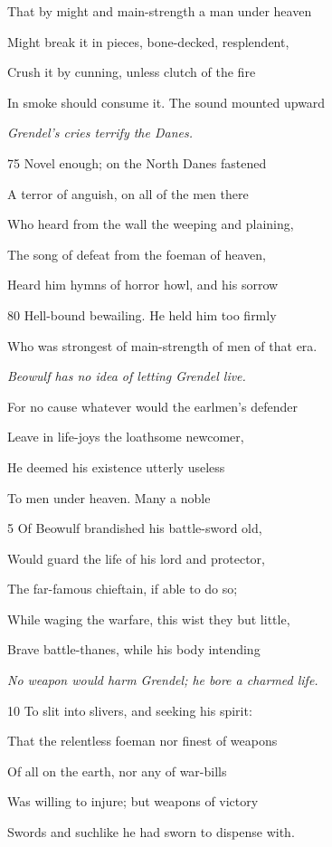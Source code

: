 That by might and main-strength a man under heaven

Might break it in pieces, bone-decked, resplendent,

Crush it by cunning, unless clutch of the fire

In smoke should consume it. The sound mounted upward

\emph{Grendel’s cries terrify
the Danes.}

75
Novel enough; on the North Danes fastened

A terror of anguish, on all of the men there

Who heard from the wall the weeping and plaining,

The song of defeat from the foeman of heaven,

Heard him hymns of horror howl, and his sorrow

80
Hell-bound bewailing. He held him too firmly

Who was strongest of main-strength of men of that era.



\emph{Beowulf has no
idea of letting
Grendel live.}

For no cause whatever would the earlmen’s defender

Leave in life-joys the loathsome newcomer,

He deemed his existence utterly useless

To men under heaven. Many a noble

5
Of Beowulf brandished his battle-sword old,

Would guard the life of his lord and protector,

The far-famous chieftain, if able to do so;

While waging the warfare, this wist they but little,

Brave battle-thanes, while his body intending

\emph{No weapon would
harm Grendel; he
bore a charmed
life.}

10
To slit into slivers, and seeking his spirit:

That the relentless foeman nor finest of weapons

Of all on the earth, nor any of war-bills

Was willing to injure; but weapons of victory

Swords and suchlike he had sworn to dispense with.

